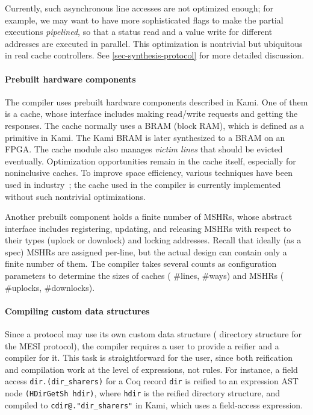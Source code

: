 \documentclass[sigplan,10pt,review,anonymous,screen]{acmart}\settopmatter{printfolios=true,printccs=false,printacmref=false}
\def\slstinline{\lstinline[basicstyle=\ttfamily\small]}
\begin{document}
Currently, such asynchronous line accesses are not optimized enough; for example, we may want to have more sophisticated flags to make the partial executions \emph{pipelined}, so that a status read and a value write for different addresses are executed in parallel.
This optimization is nontrivial but ubiquitous in real cache controllers.
See \autoref{sec-synthesis-protocol} for more detailed discussion.

\paragraph{Prebuilt hardware components}
The compiler uses prebuilt hardware components described in Kami.
One of them is a cache, whose interface includes making read/write requests and getting the responses.
The cache normally uses a BRAM (block RAM), which is defined as a primitive in Kami.
The Kami BRAM is later synthesized to a BRAM on an FPGA.
The cache module also manages \emph{victim lines} that should be evicted eventually.
Optimization opportunities remain in the cache itself, especially for noninclusive caches.
To improve space efficiency, various techniques have been used in industry~\cite{Zhao:2010,Yan:2019}; the cache used in the compiler is currently implemented without such nontrivial optimizations.

Another prebuilt component holds a finite number of MSHRs, whose abstract interface includes registering, updating, and releasing MSHRs with respect to their types (uplock or downlock) and locking addresses.
Recall that ideally (as a spec) MSHRs are assigned per-line, but the actual design can contain only a finite number of them.
The compiler takes several counts as configuration parameters to determine the sizes of caches (\eg{} \#lines, \#ways) and MSHRs (\eg{} \#uplocks, \#downlocks).

\paragraph{Compiling custom data structures}
Since a \hemiola{} protocol may use its own custom data structure (\eg{} directory structure for the MESI protocol), the compiler requires a user to provide a reifier and a compiler for it.
This task is straightforward for the user, since both reification and compilation work at the level of expressions, not rules.
For instance, a field access \slstinline{dir.(dir_sharers)} for a Coq record \slstinline{dir} is reified to an expression AST node \slstinline{(HDirGetSh hdir)}, where \slstinline{hdir} is the reified directory structure, and compiled to \slstinline{cdir@."dir_sharers"} in Kami, which uses a field-access expression.
\end{document}
